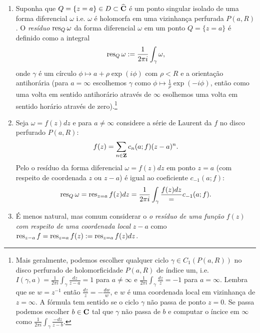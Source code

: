 \begin{defin}
\begin{enumerate}
\item Suponha que $Q = \{ z = a \} \in D \subset \widehat{\mathbf{C}}$ é um ponto singular isolado de uma forma diferencial $\omega$
i.e. $\omega$ é holomorfa em uma vizinhança perfurada $P(a,R)$.
O \emph{resíduo} $\operatorname{res}_Q \omega$ da forma diferencial $\omega$ em um ponto $Q = \{ z = a \}$
é definido como a integral
\begin{equation}
\operatorname{res}_Q \omega := \frac{1}{2\pi i} \int_\gamma \omega,
\end{equation}
onde $\gamma$ é um círculo $\phi \mapsto a + \rho \exp(i\phi)$ com $\rho<R$ e a orientação antihorária
(para $a=\infty$ escolhemos $\gamma$
como $\phi \mapsto \frac{1}{\rho} \exp(-i\phi)$,
então como uma volta em sentido antihorário através de $\infty$
esolhemos uma volta em sentido horário através de zero).\footnote{
Mais geralmente, podemos escolher qualquer ciclo $\gamma \in C_1(P(a,R))$
no disco perfurado de holomorficidade $P(a,R)$
de índice um, i.e.
$I(\gamma,a) = \frac{1}{2\pi i} \int_\gamma \frac{dz}{z-a} = 1$ para $a\neq\infty$
e $\frac{1}{2\pi i} \int_\gamma \frac{dz}{z} = -1$ para $a=\infty$. Lembra que
se $w=z^{-1}$ então $\frac{dz}{z} = -\frac{dw}{w}$,
e $w$ é uma coordenada local em vizinhança de $z=\infty$.
A fórmula tem sentido se o ciclo $\gamma$ não passa de ponto $z=0$.
Se passa podemos escolher $b\in\mathbf{C}$ tal que $\gamma$ não passa de $b$
e computar o íncice em $\infty$ como $\frac{1}{2\pi i} \int_\gamma \frac{-dz}{z-b}$.}
\item Seja $\omega = f(z) dz$ e para $a\neq\infty$
considere a série de Laurent da $f$ no disco perfurado $P(a,R)$:
\[ f(z) = \sum_{n\in\mathbf{Z}} c_n(a;f) (z-a)^n. \]
Pelo  o  resíduo da forma diferencial
$\omega = f(z) dz$ em ponto $z=a$ (com respeito de coordenada $z$ ou $z-a$)
é igual ao coeficiente $c_{-1}(a;f)$:
\begin{equation}
\operatorname{res}_Q \omega = \operatorname{res}_{z=a} f(z) dz =\frac{1}{2\pi i} \int_\gamma \frac{f(z)dz} = c_{-1}(a;f).
\end{equation}
\item É menos natural, mas comum considerar o \emph{o resíduo de uma função} $f(z)$
\emph{com respeito de uma coordenada local} $z-a$ como $\operatorname{res}_{z-a} f = \operatorname{res}_{z=a} f(z) := \operatorname{res}_{z=a} f(z) dz$.
\end{enumerate}
\end{defin}


